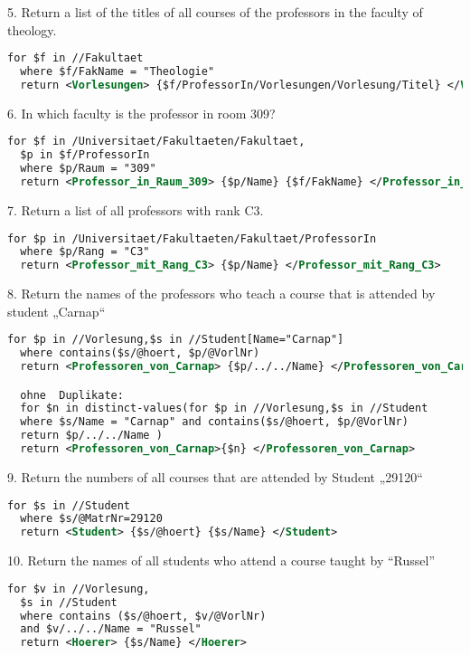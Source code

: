 5. Return	a	list	of	the	titles	of	all	courses	of	the	professors	in	the	faculty	of	theology.
\begin{lstlisting}[language=XML]
  for $f in //Fakultaet
  where $f/FakName = "Theologie"
  return <Vorlesungen> {$f/ProfessorIn/Vorlesungen/Vorlesung/Titel} </Vorlesungen>
\end{lstlisting}

6. In	which	faculty	is	the	professor	in	room	309?
\begin{lstlisting}[language=XML]
  for $f in /Universitaet/Fakultaeten/Fakultaet,
  $p in $f/ProfessorIn
  where $p/Raum = "309"
  return <Professor_in_Raum_309> {$p/Name} {$f/FakName} </Professor_in_Raum_309>
\end{lstlisting}

7. Return	a	list	of	all	professors	with	rank	C3.
\begin{lstlisting}[language=XML]
  for $p in /Universitaet/Fakultaeten/Fakultaet/ProfessorIn
  where $p/Rang = "C3"
  return <Professor_mit_Rang_C3> {$p/Name} </Professor_mit_Rang_C3>
\end{lstlisting}

8. Return	the	names	of the	professors	who	teach	a	course	that	is	attended	by	student	„Carnap“
\begin{lstlisting}[language=XML]
  for $p in //Vorlesung,$s in //Student[Name="Carnap"]
  where contains($s/@hoert, $p/@VorlNr)
  return <Professoren_von_Carnap> {$p/../../Name} </Professoren_von_Carnap>

  ohne	Duplikate:
  for $n in distinct-values(for $p in //Vorlesung,$s in //Student
  where $s/Name = "Carnap" and contains($s/@hoert, $p/@VorlNr)
  return $p/../../Name )
  return <Professoren_von_Carnap>{$n} </Professoren_von_Carnap>
\end{lstlisting}

9. Return	the	numbers	of	all	courses	that	are	attended	by	Student	„29120“
\begin{lstlisting}[language=XML]
  for $s in //Student
  where $s/@MatrNr=29120
  return <Student> {$s/@hoert} {$s/Name} </Student>
\end{lstlisting}

10. Return	the	names	of	all	students	who	attend	a	course	taught	by “Russel”
\begin{lstlisting}[language=XML]
  for $v in //Vorlesung,
  $s in //Student
  where contains ($s/@hoert, $v/@VorlNr)
  and $v/../../Name = "Russel"
  return <Hoerer> {$s/Name} </Hoerer>
\end{lstlisting}

